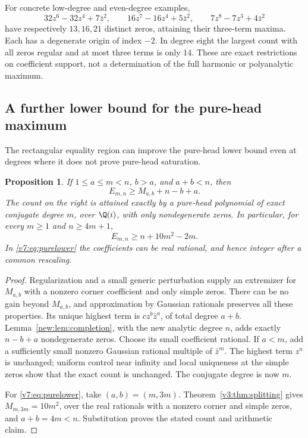 \documentclass[UTF8,11pt]{ctexart}
\newtheorem{prop}[thm]{Proposition}
\theoremstyle{definition}
\numberwithin{equation}{section}
\begin{document}
For concrete low-degree and even-degree examples,
\[
 32z^6-32z^4+7\bar z^2,\qquad
 16z^7-16z^4+5\bar z^2,\qquad
 7z^8-7z^3+4\bar z^2
\]
have respectively $13,16,21$ distinct zeros, attaining their
three-term maxima. Each has a degenerate origin of index $-2$.
In degree eight the largest count with all zeros regular and
at most three terms is only $14$. These are exact restrictions
on coefficient support, not a determination of the full
harmonic or polyanalytic maximum.


\subsection{A further lower bound for the pure-head maximum}
\label{v7:sec:completion}

The rectangular equality region can improve the pure-head lower
bound even at degrees where it does not prove pure-head saturation.

\begin{prop}\label{v7:prop:completion}
If $1\le a\le m<n$, $b>a$, and $a+b<n$, then
\begin{equation}\label{v7:eq:completion}
 E_{m,n}\ge M_{a,b}+n-b+a.
\end{equation}
The count on the right is attained exactly by a pure-head polynomial
of exact conjugate degree $m$, over $\Q(i)$, with only nondegenerate
zeros. In particular, for every $m\ge1$ and $n\ge4m+1$,
\begin{equation}\label{v7:eq:purelower}
 E_{m,n}\ge n+10m^2-2m.
\end{equation}
In \eqref{v7:eq:purelower} the coefficients can be real rational,
and hence integer after a common rescaling.
\end{prop}
\begin{proof}
Regularization and a small generic perturbation supply an extremizer
for $M_{a,b}$ with a nonzero corner coefficient and only simple zeros.
There can be no gain beyond $M_{a,b}$, and approximation by Gaussian
rationals preserves all these properties. Its unique highest term
is $cz^b\bar z^a$, of total degree $a+b$.
Lemma~\ref{new:lem:completion}, with the new analytic degree $n$,
adds exactly $n-b+a$ nondegenerate zeros. Choose its small coefficient
rational. If $a<m$, add a sufficiently small nonzero Gaussian rational
multiple of $\bar z^m$. The highest term $z^n$ is unchanged; uniform
control near infinity and local uniqueness at the simple zeros show
that the exact count is unchanged. The conjugate degree is now $m$.

For \eqref{v7:eq:purelower}, take $(a,b)=(m,3m)$.
Theorem~\ref{v3:thm:splitting} gives $M_{m,3m}=10m^2$, over
the real rationals with a nonzero corner and simple zeros, and
$a+b=4m<n$. Substitution proves the stated count and arithmetic claim.
\end{proof}
\end{document}
